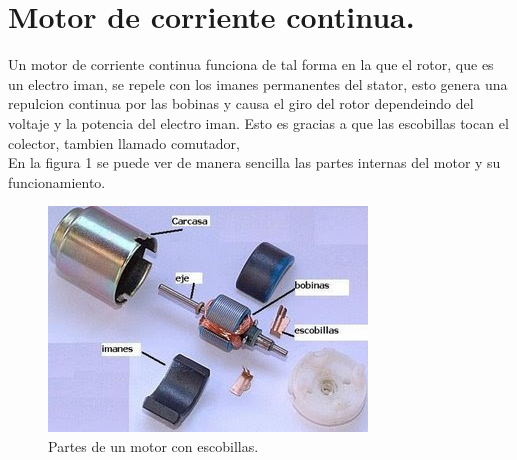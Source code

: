 \documentclass[letterpaper]{article}
\begin{document}
\section{Motor de corriente continua.}
Un motor de corriente continua funciona de tal forma en la que el rotor, que es un electro iman, se repele con los imanes permanentes del stator, esto genera una repulcion continua por las bobinas y causa el giro del rotor dependeindo del voltaje y la potencia del electro iman. Esto es gracias a que las escobillas tocan el colector, tambien llamado comutador, \\
En la figura 1 se puede ver de manera sencilla las partes internas del motor y su funcionamiento.\\
\begin{figure}[hpbt]
    \centering
    \includegraphics{IMG/mot.jpg}
    \caption{Partes de un motor con escobillas.}
    \label{fig:my_label}
\end{figure}
\end{document}
